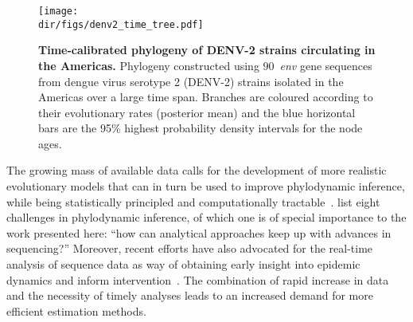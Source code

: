 \begin{figure}[!ht]
\begin{center}
\texttt{[image: \\dir/figs/denv2\_time\_tree.pdf]} 
\end{center}
 \caption[Time-calibrated phylogeny of DENV-2 strains circulating in the Americas.]{\textbf{Time-calibrated phylogeny of DENV-2 strains circulating in the Americas.}
 Phylogeny constructed using $90$~\textit{env} gene sequences from dengue virus serotype 2 (DENV-2) strains isolated in the Americas over a large time span. 
 Branches are coloured according to their  evolutionary rates (posterior mean) and the blue horizontal bars are the 95\% highest probability density intervals for the node ages. 
 }
 \label{fig:timetree}
\end{figure}

The growing mass of available data calls for the development of more realistic evolutionary models that can in turn be used to improve phylodynamic inference, while being statistically principled and computationally tractable~\citep{Pybus2013}.
\cite{Frost2015} list eight challenges in phylodynamic inference, of which one is of special importance to the work presented here: ``how can analytical approaches keep up with advances in sequencing?''
Moreover, recent efforts have also advocated for the real-time analysis of sequence data as way of obtaining early insight into epidemic dynamics and inform intervention~\citep{Quick2016,Dudas2017,Hadfield2017}.
The combination of rapid increase in data and the necessity of timely analyses leads to an increased demand for more efficient estimation methods.

